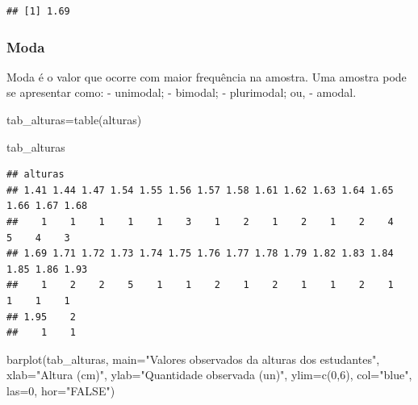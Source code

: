 \documentclass[
]{book}
\newenvironment{Shaded}{\begin{snugshade}}{\end{snugshade}}
\newcommand{\AttributeTok}[1]{\textcolor[rgb]{0.77,0.63,0.00}{#1}}
\newcommand{\DecValTok}[1]{\textcolor[rgb]{0.00,0.00,0.81}{#1}}
\newcommand{\FunctionTok}[1]{\textcolor[rgb]{0.00,0.00,0.00}{#1}}
\newcommand{\NormalTok}[1]{#1}
\newcommand{\OtherTok}[1]{\textcolor[rgb]{0.56,0.35,0.01}{#1}}
\newcommand{\StringTok}[1]{\textcolor[rgb]{0.31,0.60,0.02}{#1}}
\begin{document}
\begin{verbatim}
## [1] 1.69
\end{verbatim}

\hypertarget{moda}{%
\subsubsection{Moda}\label{moda}}

Moda é o valor que ocorre com maior frequência na amostra. Uma amostra pode se apresentar como:
- unimodal;
- bimodal;
- plurimodal; ou,
- amodal.

\begin{Shaded}
\begin{Highlighting}[]
\NormalTok{tab\_alturas}\OtherTok{=}\FunctionTok{table}\NormalTok{(alturas)}

\NormalTok{tab\_alturas}
\end{Highlighting}
\end{Shaded}

\begin{verbatim}
## alturas
## 1.41 1.44 1.47 1.54 1.55 1.56 1.57 1.58 1.61 1.62 1.63 1.64 1.65 1.66 1.67 1.68 
##    1    1    1    1    1    3    1    2    1    2    1    2    4    5    4    3 
## 1.69 1.71 1.72 1.73 1.74 1.75 1.76 1.77 1.78 1.79 1.82 1.83 1.84 1.85 1.86 1.93 
##    1    2    2    5    1    1    2    1    2    1    1    2    1    1    1    1 
## 1.95    2 
##    1    1
\end{verbatim}

\begin{Shaded}
\begin{Highlighting}[]
\FunctionTok{barplot}\NormalTok{(tab\_alturas,}
        \AttributeTok{main=}\StringTok{"Valores observados da alturas dos estudantes"}\NormalTok{,}
        \AttributeTok{xlab=}\StringTok{"Altura (cm)"}\NormalTok{,}
        \AttributeTok{ylab=}\StringTok{"Quantidade observada (un)"}\NormalTok{,}
        \AttributeTok{ylim=}\FunctionTok{c}\NormalTok{(}\DecValTok{0}\NormalTok{,}\DecValTok{6}\NormalTok{),}
        \AttributeTok{col=}\StringTok{"blue"}\NormalTok{,}
        \AttributeTok{las=}\DecValTok{0}\NormalTok{, }
        \AttributeTok{hor=}\StringTok{"FALSE"}\NormalTok{)}
\end{Highlighting}
\end{Shaded}
\end{document}
